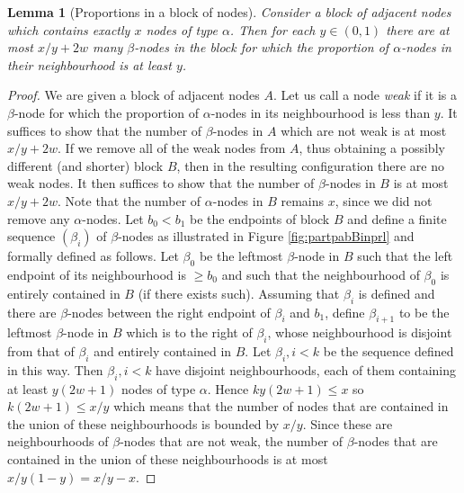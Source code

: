 \documentclass[11pt]{article}
\theoremstyle{plain}
\newtheorem{lem}[thm]{Lemma}
\numberwithin{equation}{subsection}
\begin{document}
\begin{lem}[Proportions in a block of nodes]\label{le:blockofpro}
Consider a block of adjacent nodes 
which contains exactly $x$ nodes of type $\alpha$.
Then for each $y\in (0,1)$ there are at most $x/y+2w$ many $\beta$-nodes in the block
for which the proportion of $\alpha$-nodes in their neighbourhood is at least $y$.
\end{lem}
\begin{proof}
We are given a block of 
adjacent nodes $A$.
Let us call a node {\em weak} if it is a 
$\beta$-node for which the proportion of $\alpha$-nodes
in its neighbourhood is less than $y$.
It suffices to show that the number of $\beta$-nodes in $A$ 
which are not weak is at most $x/y +2w$.
If we remove all of the weak nodes from $A$,  thus obtaining a possibly 
different (and shorter) block $B$, then in the resulting configuration there are no weak nodes. 
It then suffices to show that the number of $\beta$-nodes
in $B$ is at most $x/y+2w$.
Note that the number of $\alpha$-nodes in $B$ remains $x$, since we did not remove any $\alpha$-nodes.
Let $b_0<b_1$ be the endpoints of block $B$ and define a finite sequence $(\beta_i)$ of
$\beta$-nodes as illustrated in Figure \ref{fig:partpabBinprl} 
and formally defined as follows. Let $\beta_0$ 
be the leftmost $\beta$-node in $B$ such that the left endpoint of its neighbourhood  is $\geq b_0$ and such that the neighbourhood of $\beta_0$ is entirely contained in $B$ (if there exists such). 
Assuming that $\beta_i$ is defined and there are $\beta$-nodes between the right endpoint of $\beta_i$ and $b_1$,
define $\beta_{i+1}$ to be the leftmost $\beta$-node in $B$ which is to the right of $\beta_i$, whose neighbourhood is disjoint from that of $\beta_i$ and entirely contained in $B$. Let $\beta_i, i<k$ be the sequence defined in this way.
Then $\beta_i, i<k$ have disjoint neighbourhoods, each of them containing at least $y(2w+1)$ nodes of type $\alpha$.
Hence 
$ky(2w+1)\leq x$ so $k(2w+1)\leq x/y$ which means that the number
of nodes that are contained in the union of these
neighbourhoods is bounded by $x/y$. Since these are neighbourhoods of
$\beta$-nodes that are not weak, the number of $\beta$-nodes that are contained in the
union of these neighbourhoods is at most $x/y(1-y)=x/y-x$.


\end{proof}
\end{document}
